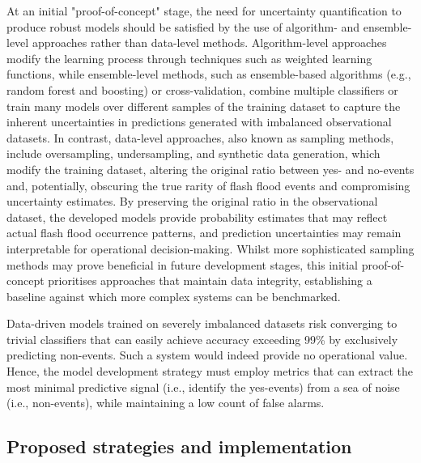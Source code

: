 At  an initial "proof-of-concept" stage, the need for uncertainty quantification to produce robust models should be satisfied by the use of algorithm- and ensemble-level approaches rather than data-level methods. Algorithm-level approaches modify the learning process through techniques such as weighted learning functions, while ensemble-level methods, such as ensemble-based algorithms (e.g., random forest and boosting) or cross-validation, combine multiple classifiers or train many models over different samples of the training dataset to capture the inherent uncertainties in predictions generated with imbalanced observational datasets. In contrast, data-level approaches, also known as sampling methods, include oversampling, undersampling, and synthetic data generation, which modify the training dataset, altering the original ratio between yes- and no-events and, potentially, obscuring the true rarity of flash flood events and compromising uncertainty estimates. By preserving the original ratio in the observational dataset, the developed models provide probability estimates that may reflect actual flash flood occurrence patterns, and prediction uncertainties may remain interpretable for operational decision-making. Whilst more sophisticated sampling methods may prove beneficial in future development stages, this initial proof-of-concept prioritises approaches that maintain data integrity, establishing a baseline against which more complex systems can be benchmarked.

Data-driven  models trained on severely imbalanced datasets risk converging to trivial classifiers that can easily achieve accuracy exceeding 99\% by exclusively predicting non-events. Such a system would indeed provide no operational value. Hence, the model development strategy must employ metrics that can extract the most minimal predictive signal (i.e., identify the yes-events) from a sea of noise (i.e., non-events), while maintaining a low count of false alarms.

\subsection{Proposed strategies and implementation}

